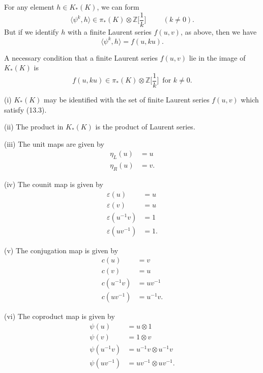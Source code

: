 \documentclass[../main]{subfiles}
\begin{document}
For any element $h\in K_\ast(K)$, we can form \[\langle\psi^k, h\rangle \in\pi_\ast(K)\otimes\mathbb{Z}\Big[\dfrac{1}{k}\Big]\hspace{1cm} (k\neq 0).\]
But if we identify $h$ with a finite Laurent series $f(u,v)$, as above, then we have 
\begin{equation}
\tag{13.1}
\langle\psi^k, h\rangle = f(u,ku).
\end{equation}
\begin{customcor}{13.2}
\label{cor:pt2ch13.2}
A necessary condition that a finite Laurent series $f(u,v)$ lie in the image of $K_\ast(K)$ is 
\begin{equation}
\label{eqn:p2c13.3}
\tag{13.3}
f(u,ku)\in \pi_\ast(K)\otimes\mathbb{Z}\Big[\dfrac{1}{k}\Big] \,\text{ for } k\neq 0.
\end{equation}
\end{customcor}
\begin{customthm}{13.4}
\label{thm:p2c13.4}
(i) $K_\ast(K)$ may be identified with the set of finite Laurent series $f(u,v)$ which satisfy (13.3). 

(ii) The product in $K_\ast(K)$ is the product of Laurent series.

(iii) The unit maps are given by 
\begin{align*}
    \eta_L(u) &= u\\
    \eta_R(u) &= v.
\end{align*}

(iv) The counit map is given by
\begin{align*}
    \varepsilon(u)&=u\\
    \varepsilon(v)&=u\\
    \varepsilon(u^{-1}v)&=1\\
    \varepsilon(uv^{-1})&=1.
\end{align*}

(v) The conjugation map is given by
\begin{align*}
    c(u)&=v\\
    c(v)&=u\\
    c(u^{-1}v)&=uv^{-1}\\
    c(uv^{-1})&=u^{-1}v.
\end{align*}

(vi) The coproduct map is given by
\begin{align*}
    \psi(u)&=u\otimes 1\\
    \psi(v)&=1\otimes v\\
    \psi(u^{-1}v)&=u^{-1}v\otimes u^{-1}v\\
    \psi(uv^{-1})&=uv^{-1}\otimes uv^{-1}.
\end{align*}
\end{customthm}
\end{document}
